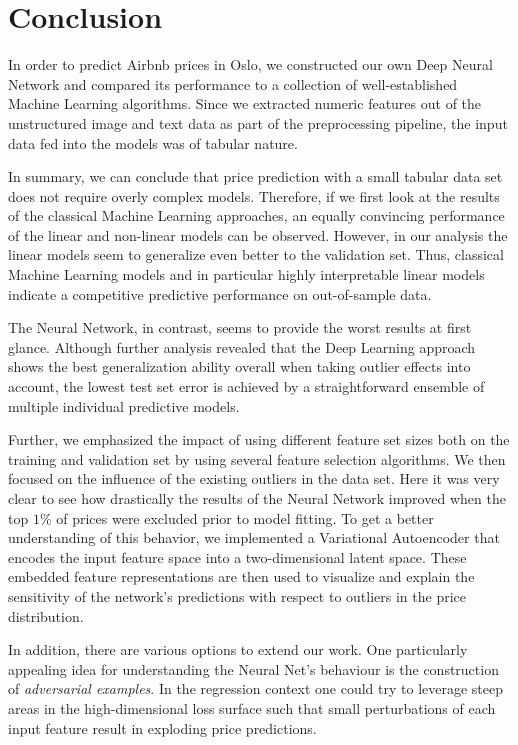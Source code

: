 \section{Conclusion}

In order to predict Airbnb prices in Oslo, we constructed our own Deep Neural Network and compared its performance to a collection of well-established Machine Learning algorithms.
Since we extracted numeric features out of the unstructured image and text data as part of the preprocessing pipeline, the input data fed into the models was of tabular nature.

In summary, we can conclude that price prediction with a small tabular data set does not require overly complex models. Therefore, if we first look at the results of the classical Machine Learning approaches, an equally convincing performance of the linear and non-linear models can be observed. However, in our analysis the linear models seem to generalize even better to the validation set. Thus, classical Machine Learning models and in particular highly interpretable linear models indicate a competitive predictive performance on out-of-sample data.

The Neural Network, in contrast, seems to provide the worst results at first glance. Although further analysis revealed that the Deep Learning approach shows the best generalization ability overall when taking outlier effects into account, the lowest test set error is achieved by a straightforward ensemble of multiple individual predictive models.

Further, we emphasized the impact of using different feature set sizes both on the training and validation set by using several feature selection algorithms.
We then focused on the influence of the existing outliers in the data set.
Here it was very clear to see how drastically the results of the Neural Network improved when the top $1$\% of prices were excluded prior to model fitting.
To get a better understanding of this behavior, we implemented a Variational Autoencoder that encodes the input feature space into a two-dimensional latent space.
These embedded feature representations are then used to visualize and explain the sensitivity of the network's predictions with respect to outliers in the price distribution.

In addition, there are various options to extend our work.
One particularly appealing idea for understanding the Neural Net's behaviour is the construction of \emph{adversarial examples}.
In the regression context one could try to leverage steep areas in the high-dimensional loss surface such that small perturbations of each input feature result in exploding price predictions.

